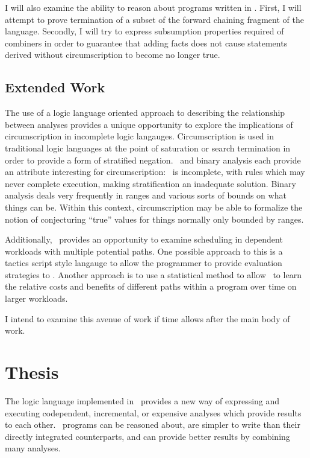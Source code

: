 I will also examine the ability to reason about programs written in \sysname.
First, I will attempt to prove termination of a subset of the forward chaining fragment of the language.
Secondly, I will try to express subsumption properties required of combiners in order to guarantee that adding facts does not cause statements derived without circumscription to become no longer true.
\subsection{Extended Work}
The use of a logic language oriented approach to describing the relationship between analyses provides a unique opportunity to explore the implications of circumscription in incomplete logic langauges.
Circumscription is used in traditional logic languages at the point of saturation or search termination in order to provide a form of stratified negation.
\sysname\ and binary analysis each provide an attribute interesting for circumscription:
\sysname\ is incomplete, with rules which may never complete execution, making stratification an inadequate solution.
Binary analysis deals very frequently in ranges and various sorts of bounds on what things can be.
Within this context, circumscription may be able to formalize the notion of conjecturing ``true'' values for things normally only bounded by ranges.

Additionally, \sysname\ provides an opportunity to examine scheduling in dependent workloads with multiple potential paths.
One possible approach to this is a tactics script style langauge to allow the programmer to provide evaluation strategies to \sysname.
Another approach is to use a statistical method to allow \sysname\ to learn the relative costs and benefits of different paths within a program over time on larger workloads.

I intend to examine this avenue of work if time allows after the main body of work.
\section{Thesis}
The logic language implemented in \sysname\ provides a new way of expressing and executing codependent, incremental, or expensive analyses which provide results to each other. \sysname\ programs can be reasoned about, are simpler to write than their directly integrated counterparts, and can provide better results by combining many analyses.
